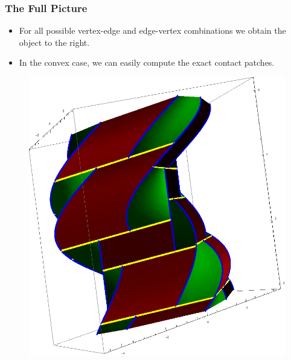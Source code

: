 \documentclass[ucs,9pt,pagenumbers]{beamer}
\begin{document}
\begin{frame}
  \frametitle{The Full Picture}
  \begin{minipage}[c][\textheight]{0.5\linewidth}
    \begin{itemize}
    \item<1-> For all possible vertex-edge and edge-vertex combinations we obtain the object to
      the right.
    \item<1-> In the convex case, we can easily compute the exact
      contact patches.
    \end{itemize}
  \end{minipage}
  \hfill
  \begin{minipage}[c][\textheight]{0.45\linewidth}
    \begin{figure}
      \centering
      \includegraphics[width=0.95\linewidth]{Figures/full_contact}
    \end{figure}
  \end{minipage}
\end{frame}
\end{document}
